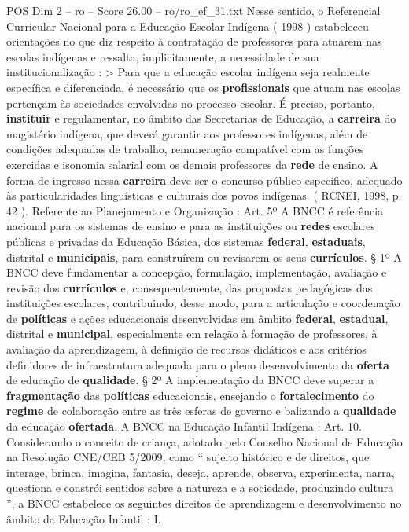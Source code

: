 \begin{textsample}{POS Dim 2 – ro – Score 26.00 – ro/ro\_ef\_31.txt}
Nesse sentido, o Referencial Curricular Nacional para a Educação Escolar Indígena ( 1998 ) estabeleceu orientações no que diz respeito à contratação de professores para atuarem nas escolas indígenas e ressalta, implicitamente, a necessidade de sua institucionalização : > Para que a educação escolar indígena seja realmente específica e diferenciada, é necessário que os \textbf{profissionais} que atuam nas escolas pertençam às sociedades envolvidas no processo escolar.
É preciso, portanto, \textbf{instituir} e regulamentar, no âmbito das Secretarias de Educação, a \textbf{carreira} do magistério indígena, que deverá garantir aos professores indígenas, além de condições adequadas de trabalho, remuneração compatível com as funções exercidas e isonomia salarial com os demais professores da \textbf{rede} de ensino.
A forma de ingresso nessa \textbf{carreira} deve ser o concurso público específico, adequado às particularidades linguísticas e culturais dos povos indígenas. ( RCNEI, 1998, p. 42 ).
Referente ao Planejamento e Organização : Art. 5º A BNCC é referência nacional para os sistemas de ensino e para as instituições ou \textbf{redes} escolares públicas e privadas da Educação Básica, dos sistemas \textbf{federal}, \textbf{estaduais}, distrital e \textbf{municipais}, para construírem ou revisarem os seus \textbf{currículos}. § 1º A BNCC deve fundamentar a concepção, formulação, implementação, avaliação e revisão dos \textbf{currículos} e, consequentemente, das propostas pedagógicas das instituições escolares, contribuindo, desse modo, para a articulação e coordenação de \textbf{políticas} e ações educacionais desenvolvidas em âmbito \textbf{federal}, \textbf{estadual}, distrital e \textbf{municipal}, especialmente em relação à formação de professores, à avaliação da aprendizagem, à definição de recursos didáticos e aos critérios definidores de infraestrutura adequada para o pleno desenvolvimento da \textbf{oferta} de educação de \textbf{qualidade}. § 2º A implementação da BNCC deve superar a \textbf{fragmentação} das \textbf{políticas} educacionais, ensejando o \textbf{fortalecimento} do \textbf{regime} de colaboração entre as três esferas de governo e balizando a \textbf{qualidade} da educação \textbf{ofertada}.
A BNCC na Educação Infantil Indígena : Art. 10.
Considerando o conceito de criança, adotado pelo Conselho Nacional de Educação na Resolução CNE/CEB 5/2009, como “ sujeito histórico e de direitos, que interage, brinca, imagina, fantasia, deseja, aprende, observa, experimenta, narra, questiona e constrói sentidos sobre a natureza e a sociedade, produzindo cultura ”, a BNCC estabelece os seguintes direitos de aprendizagem e desenvolvimento no âmbito da Educação Infantil : I.

\end{textsample}
